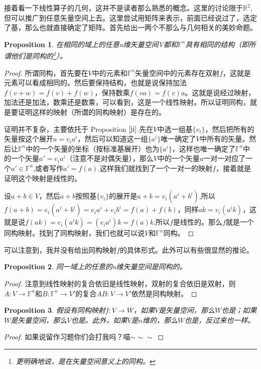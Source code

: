 \documentclass[11pt,a4paper,openany]{book}%
\theoremstyle{plain}%
\newtheorem{pro}{Proposition}[chapter]%
\newcommand{\pref}[1]{{\rm Proposition} $\ref{#1}$}
\begin{document}
接着看一下线性算子的几何，这并不是读者那么熟悉的概念。这里的讨论限于$\mathbb{R}^{2}$,但可以推广到任意矢量空间上去。这里尝试用矩阵来表示，前面已经说过了，选定了基，那么也就直接确定了矩阵。首先给出一两个不那么与几何相关的美妙命题。
\begin{pro}
\label{空间同构}
在相同的域上的任意n维矢量空间V都和$\mathbb{F}^{n}$具有相同的结构（即所谓他们是同构的\footnote{更明确地说，是在矢量空间意义上的同构。}）。
\end{pro}
\begin{proof}
所谓同构，首先要在$V$中的元素和$\mathbb{F}^{n}$矢量空间中的元素存在双射$f$，这就是元素可以看成相同的。然后要保持结构，也就是说保持加法$f(v+w)=f(v)+f(w)$，保持数乘$f(va)=f(v)a$。这就是说经过映射，加法还是加法，数乘还是数乘，可以看到，这是一个线性映射。所以证明同构，就是要证明这样的映射（所谓的同构映射）是存在的。

证明并不复杂，主要依托于 \pref{ji}.先在$V$中选一组基$\{v_i\}$，然后把所有的矢量按这个展开$a=v_ia^i$，然后可以知道这一组$\{a^i\}$唯一确定了$V$中所有的矢量。然后让$\mathbb{F}^{n}$中的一个矢量的坐标（按标准基展开）也为$\{a^i\}$，这样也唯一确定了$\mathbb{F}^{n}$中的一个矢量$a'=e_ia^i$（注意不是对偶矢量），那么$V$中的一个矢量$a$一对一对应了一个$a' \in \mathbb{F}^{n}$,或者写作$a'=f(a)$.这样我们就找到了一个一对一的映射$f$，接着就是证明这个映射是线性的。

设$a+b \in V$，然后$a+b$按照基$\{v_i\}$的展开是$a+b=v_i(a^i+b^i)$,所以$f(a+b)=e_i(a^i+b^i)=e_ia^i+e_ib^i=f(a)+f(b)$，同样$ak=v_i(a^ik)$，这就是说$f(ak)=e_i(a^ik)=(e_ia^i)k=f(a)k$,所以$f$是线性的。那么$f$就是一个同构映射。找到了同构映射，我们也就可以说$V$和$\mathbb{F}^{n}$同构。
\end{proof}

可以注意到，我并没有给出同构映射$f$的具体形式。此外可以有些很显然的推论。
\begin{pro}
同一域上的任意的n维矢量空间是同构的。
\end{pro}
\begin{proof}
注意到线性映射的复合依旧是线性映射，双射的复合依旧是双射，则$A:V\rightarrow \mathbb{F}^{n}$和$B:\mathbb{F}^{n}\rightarrow V'$的复合$AB:V\rightarrow V'$依然是同构映射。
\end{proof}
\begin{pro}
\label{同构传递空间结构}
假设有同构映射$f:V\rightarrow W$，如果$V$是矢量空间，那么$W$也是；如果$W$是矢量空间，那么$V$也是。此外，如果$V$是$n$维的，那么$W$也是，反过来也一样。
\end{pro}
\begin{proof}
如果说留作习题你们会打我吗？喵$\sim \sim \sim$
\end{proof}
\end{document}
